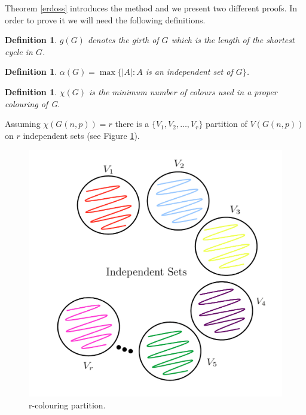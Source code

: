 \documentclass[12pt,twoside,a4paper,bibliography=totocnumbered]{book}
\numberwithin{equation}{section}
\newtheorem{definition}	[theorem] {Definition}
\theoremstyle{remark}
\begin{document}


Theorem \ref{erdoss} introduces the method and we present two different proofs. In order to prove it we will need the following definitions.

\begin{definition}\label{def:girth}
$g(G)$ denotes the \emph{girth} of $G$ which is the length of the shortest cycle in $G$. 
\end{definition}
\begin{definition}\label{def:independencenumber}
$\alpha(G) = \max\{|A|\colon A$ is an independent set of $G\}$.
\end{definition}
\begin{definition}\label{def:chromaticnumber}
$\chi(G)$ is the minimum number of colours used in a proper colouring of G.
\end{definition}
Assuming $\chi(G(n,p)) = r$ there is a $\{V_1,V_2,\ldots,V_r\}$ partition of $V(G(n,p))$ on $r$ independent sets (see Figure \ref{fig:r-partition}).

\begin{figure}[H]
     \centering
     \includegraphics[scale=1]{Figuras/r-partion.jpg}
     \caption{r-colouring partition. }
     \label{fig:r-partition}
\end{figure}
\end{document}
